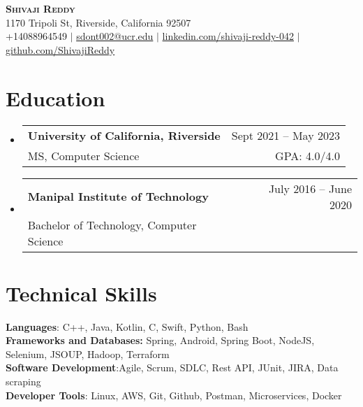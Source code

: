 \documentclass[letterpaper,11pt]{article}
\makeatletter
\newcommand{\resumeSubheading}[4]{
  \vspace{-2pt}\item
    \begin{tabular*}{0.97\textwidth}[t]{l@{\extracolsep{\fill}}r}
      \textbf{#1} & #2 \\
      {\small#3} & {\small #4} \\
    \end{tabular*}\vspace{-7pt}
}
\newcommand{\resumeSubHeadingListStart}{\begin{itemize}[leftmargin=0.15in, label={}]}
\newcommand{\resumeSubHeadingListEnd}{\end{itemize}}
\makeatother
\begin{document}

\begin{center}
    \textbf{\Huge \scshape Shivaji Reddy} \\ \vspace{1pt} 
    \smallskip
    \small 1170 Tripoli St, Riverside, California 92507 \\
    
    \small +14088964549 $|$ \href{mailto:x@x.com}{sdont002@ucr.edu} $|$ 
    \href{https://www.linkedin.com/in/shivaji-reddy-042/}{linkedin.com/shivaji-reddy-042} $|$
    \href{https://github.com/ShivajiReddy}{github.com/ShivajiReddy}
\end{center}


\section{Education}
  \resumeSubHeadingListStart
    \resumeSubheading
      {University of California, Riverside}{Sept 2021 -- May 2023}
      {MS, Computer Science}{GPA: 4.0/4.0}
    \resumeSubheading
      {Manipal Institute of Technology}{July 2016 -- June 2020}
      {Bachelor of Technology, Computer Science}{}
  \resumeSubHeadingListEnd

\section{Technical Skills}
 \begin{itemize}[leftmargin=0.15in, label={}]
    \small{\item{
     \textbf{Languages}{: C++, Java, Kotlin, C, Swift, Python, Bash} \\
     \textbf{Frameworks and Databases: }{Spring, Android, Spring Boot, NodeJS, Selenium, JSOUP, Hadoop, Terraform} \\
     \textbf{Software Development}{:Agile, Scrum, SDLC, Rest API, JUnit, JIRA, Data scraping} \\
     \textbf{Developer Tools}{: Linux, AWS, Git, Github, Postman, Microservices, Docker} 
    }}
 \end{itemize}
\end{document}
